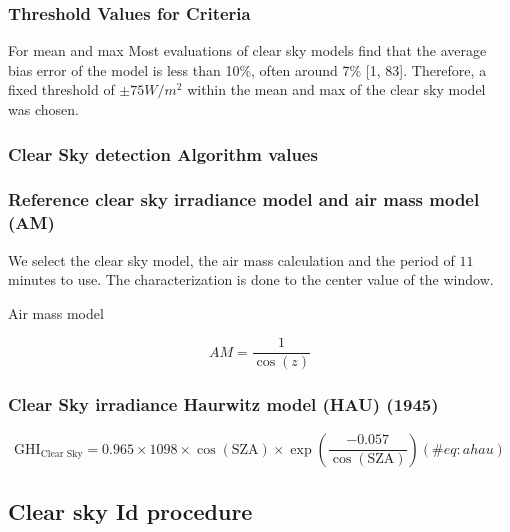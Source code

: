 \documentclass[
  10pt,
  a4paper,oneside]{article}
\begin{document}
\hypertarget{threshold-values-for-criteria}{%
\subsubsection{Threshold Values for Criteria}\label{threshold-values-for-criteria}}

For mean and max Most evaluations of clear sky models find that the average
bias error of the model is less than 10\%, often around 7\% {[}1, 83{]}. Therefore,
a fixed threshold of \(\pm 75 W / m^2\) within the mean and max of the clear sky model
was chosen.

\hypertarget{clear-sky-detection-algorithm-values}{%
\subsubsection{Clear Sky detection Algorithm values}\label{clear-sky-detection-algorithm-values}}

\hypertarget{reference-clear-sky-irradiance-model-and-air-mass-model-am}{%
\subsubsection{Reference clear sky irradiance model and air mass model (AM)}\label{reference-clear-sky-irradiance-model-and-air-mass-model-am}}

We select the clear sky model, the air mass calculation
and the period of \(11\) minutes to use.
The characterization is done to the center value of the window.

Air mass model

\[ AM = \frac{1}{\cos(z)} \]

\hypertarget{clear-sky-irradiance-haurwitz-model-hau-1945}{%
\subsubsection{Clear Sky irradiance Haurwitz model (HAU) (1945)}\label{clear-sky-irradiance-haurwitz-model-hau-1945}}

\begin{equation}
\text{GHI}_\text{Clear Sky} = 0.965 \times 1098 \times \cos( \text{SZA} ) \times \exp \left( \frac{ - 0.057}{\cos(\text{SZA})} \right)  (\#eq:ahau)
\end{equation}

\hypertarget{clear-sky-id-procedure}{%
\subsection{Clear sky Id procedure}\label{clear-sky-id-procedure}}
\end{document}
